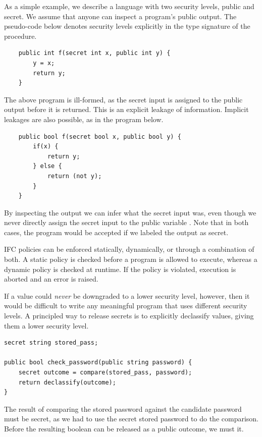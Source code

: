 As a simple example, we describe a language with two security levels, public and secret. We assume that anyone can inspect
a program's public output. The pseudo-code below denotes security levels explicitly in the type signature
of the procedure.

\begin{verbatim}
    public int f(secret int x, public int y) {
        y = x;
        return y;
    }
\end{verbatim}

The above program is ill-formed, as the secret input is assigned to the public output before it is returned. This is an
explicit leakage of information. Implicit leakages are also possible, as in the program below.

\begin{verbatim}
    public bool f(secret bool x, public bool y) {
        if(x) {
            return y;
        } else {
            return (not y);
        }
    }
\end{verbatim}

By inspecting the output we can infer what the secret input was, even though we never directly assign the secret input
to the public variable . Note that in both cases, the program would be accepted if we labeled the output as secret.

IFC policies can be enforced statically, dynamically, or through a combination of both. A static policy is checked before
a program is allowed to execute, whereas a dynamic policy is checked at runtime. If the policy is violated, execution
is aborted and an error is raised.

If a value could \textit{never} be downgraded to a lower security level, however, then it would be difficult to write any meaningful program that uses
different security levels. A principled way to release secrets is to explicitly declassify values, giving them a lower
security level.

\begin{verbatim}
secret string stored_pass;

public bool check_password(public string password) {
    secret outcome = compare(stored_pass, password);
    return declassify(outcome);
}
\end{verbatim}

The result of comparing the stored password against the candidate password must be secret, as we had to use the secret stored
password to do the comparison. Before the resulting boolean can be released as a public outcome, we must
 it.

